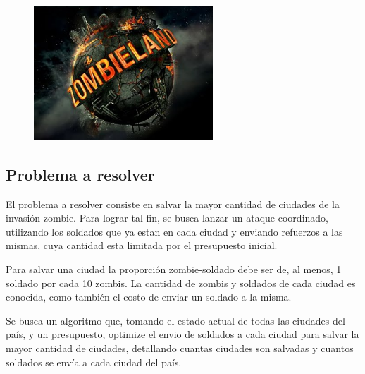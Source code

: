 \begin{figure}[h]
\begin{center}
\includegraphics[width=0.6\textwidth] {imagenes/zombieland.png}
\end{center}
\end{figure}

\subsection{Problema a resolver}

El problema a resolver consiste en salvar la mayor cantidad de ciudades de la invasión zombie. Para lograr tal fin, se busca lanzar un ataque coordinado, utilizando los soldados que ya estan en cada ciudad y enviando refuerzos a las mismas, cuya cantidad esta limitada por el presupuesto inicial. 

Para salvar una ciudad la proporción zombie-soldado debe ser de, al menos, 1 soldado por cada 10 zombis. La cantidad de zombis y soldados de cada ciudad es conocida, como también el costo de enviar un soldado a la misma.

Se busca un algoritmo que, tomando el estado actual de todas las ciudades del país, y un presupuesto, optimize el envio de soldados a cada ciudad para salvar la mayor cantidad de ciudades, detallando cuantas ciudades son salvadas y cuantos soldados se envía a cada ciudad del país.

